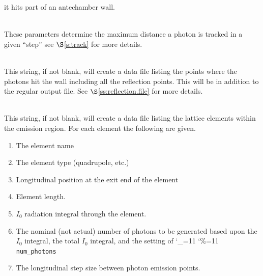 \documentclass[11pt]{article}
\newcommand{\sref}[1]{$\S$\ref{#1}}
\newcommand\ttcmd{\begingroup\catcode`\_=11 \catcode`\%=11 \dottcmd}
\newcommand\dottcmd[1]{\texttt{#1}\endgroup}
\newcommand{\vn}{\ttcmd}
\newcommand{\Newline}{\hfil \\}
\begin{document}
\begin{description}
it hits part of an antechamber wall.
  \item[\vn{sr3d_params\%ds_track_step_max}, \vn{sr3d_params\%dr_track_step_max}] \Newline
These parameters determine the maximum distance a photon is tracked in
a given ``step'' see \sref{s:track} for more details.
  \item[\vn{wall_hit_file}] \Newline
This string, if not blank, will create a data file listing the points
where the photons hit the wall including all the reflection
points. This will be in addition to the regular output file.  See
\sref{ss:reflection.file} for more details.
  \item[\vn{lat_ele_file}] \Newline
This string, if not blank, will create a data file listing  the lattice
elements within the emission region. For each element the following are given. 
  \begin{enumerate}
  \item
    The element name
  \item
    The element type (quadrupole, etc.)
  \item
    Longitudinal position at the exit end of the element
  \item
    Element length.
  \item
    $I_0$ radiation integral through the element.
  \item
    The nominal (not actual) number of photons to be generated based upon the $I_0$ integral,
    the total $I_0$ integral, and the setting of \vn{num_photons}
  \item
    The longitudinal step size between photon emission points.
  \end{enumerate}


\end{description}
\end{document}
